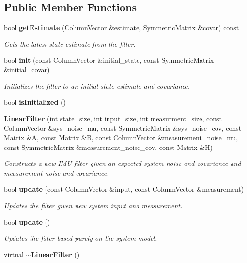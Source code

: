 \subsection*{\-Public \-Member \-Functions}
\begin{DoxyCompactItemize}
\item 
bool {\bf get\-Estimate} (\-Column\-Vector \&estimate, \-Symmetric\-Matrix \&covar) const 
\begin{DoxyCompactList}\small\item\em \-Gets the latest state estimate from the filter. \end{DoxyCompactList}\item 
bool {\bf init} (const \-Column\-Vector \&initial\-\_\-state, const \-Symmetric\-Matrix \&initial\-\_\-covar)
\begin{DoxyCompactList}\small\item\em \-Initializes the filter to an initial state estimate and covariance. \end{DoxyCompactList}\item 
bool {\bf is\-Initialized} ()
\item 
{\bf \-Linear\-Filter} (int state\-\_\-size, int input\-\_\-size, int measurment\-\_\-size, const \-Column\-Vector \&sys\-\_\-noise\-\_\-mu, const \-Symmetric\-Matrix \&sys\-\_\-noise\-\_\-cov, const \-Matrix \&\-A, const \-Matrix \&\-B, const \-Column\-Vector \&measurement\-\_\-noise\-\_\-mu, const \-Symmetric\-Matrix \&measurement\-\_\-noise\-\_\-cov, const \-Matrix \&\-H)
\begin{DoxyCompactList}\small\item\em \-Constructs a new \-I\-M\-U filter given an expected system noise and covariance and measurement noise and covariance. \end{DoxyCompactList}\item 
bool {\bf update} (const \-Column\-Vector \&input, const \-Column\-Vector \&measurement)
\begin{DoxyCompactList}\small\item\em \-Updates the filter given new system input and measurement. \end{DoxyCompactList}\item 
bool {\bf update} ()
\begin{DoxyCompactList}\small\item\em \-Updates the filter based purely on the system model. \end{DoxyCompactList}\item 
virtual {\bf $\sim$\-Linear\-Filter} ()
\end{DoxyCompactItemize}
